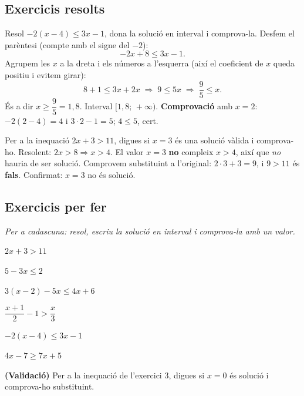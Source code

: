 \subsection{Exercicis resolts}

\begin{exresolt}
Resol $-2(x-4)\le 3x-1$, dona la solució en interval i comprova-la.
\solucio
Desfem el parèntesi (compte amb el signe del $-2$):
\[
-2x+8\le 3x-1.
\]
Agrupem les $x$ a la dreta i els números a l'esquerra (així el coeficient de $x$
queda positiu i evitem girar):
\[
8+1\le 3x+2x \;\Rightarrow\; 9\le 5x \;\Rightarrow\; \frac{9}{5}\le x.
\]
És a dir $x\ge\dfrac{9}{5}=1,8$. Interval $[1,8;\,+\infty)$. \textbf{Comprovació} amb
$x=2$: $-2(2-4)=4$ i $3\cdot 2-1=5$; $4\le 5$, cert.
\resposta{$x\ge 1,8$, interval $[1,8;\,+\infty)$.}
\end{exresolt}

\begin{exresolt}
Per a la inequació $2x+3>11$, digues si $x=3$ és una solució vàlida i comprova-ho.
\solucio
Resolent: $2x>8 \Rightarrow x>4$. El valor $x=3$ \textbf{no} compleix $x>4$, així que
\emph{no} hauria de ser solució. Comprovem substituint a l'original: $2\cdot 3+3=9$,
i $9>11$ és \textbf{fals}. Confirmat: $x=3$ no és solució.
\end{exresolt}

\subsection{Exercicis per fer}

\noindent\textit{Per a cadascuna: resol, escriu la solució en interval i comprova-la
amb un valor.}

\begin{exercicis}
\begin{exlist}
  \item $2x+3>11$
  \item $5-3x\le 2$
  \item $3(x-2)-5x\le 4x+6$
  \item $\dfrac{x+1}{2}-1>\dfrac{x}{3}$
  \item $-2(x-4)\le 3x-1$
  \item $4x-7\ge 7x+5$
  \item \textbf{(Validació)} Per a la inequació de l'exercici 3, digues si $x=0$ és
        solució i comprova-ho substituint.
\end{exlist}
\end{exercicis}

